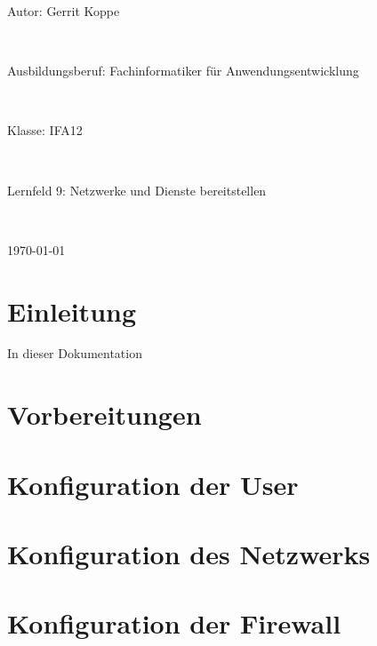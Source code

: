 \documentclass[a4paper, 11pt]{scrartcl}
\begin{document}
\begin{center}
    \vspace{0.1\textheight}
    \begin{Large}
        Autor: Gerrit Koppe
    \end{Large}
    \\
    \vspace{0.5cm}
    \begin{Large}
        Ausbildungsberuf: Fachinformatiker für Anwendungsentwicklung
    \end{Large}
    \\
    \vspace{0.5cm}
    \begin{Large}
        Klasse: IFA12
    \end{Large}
    \\
    \vspace{0.5cm}
    \begin{Large}
        Lernfeld 9: Netzwerke und Dienste bereitstellen
    \end{Large}
    \\
    \vspace{0.5cm}
    \begin{Large}
        \today
    \end{Large}
\end{center}
\newpage
\thispagestyle{empty}
\tableofcontents
\newpage
\clearpage
{}
\section{Einleitung}
In dieser Dokumentation %



\section{Vorbereitungen}




\section{Konfiguration der User}



\section{Konfiguration des Netzwerks}




\section{Konfiguration der Firewall}
\end{document}
